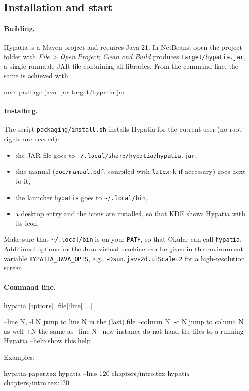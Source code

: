 \documentclass[11pt]{article}
\newcommand{\menu}[1]{\textsf{\textit{#1}}}
\newcommand{\file}[1]{\texttt{#1}}
\begin{document}
    \subsection{Installation and start}

    \paragraph{Building.}     Hypatia is a Maven project and requires Java 21. In NetBeans, open the project folder with \menu{File > Open Project}; \menu{Clean and Build} produces \file{target/hypatia.jar}, a single runnable JAR file containing all libraries. From the command line, the same is achieved with
    \begin{Code}
mvn package
java -jar target/hypatia.jar
    \end{Code}

    \paragraph{Installing.}     The script \file{packaging/install.sh} installs Hypatia for the current user (no root rights are needed):
    \begin{itemize}
        \itemsep-1mm
        \item the JAR file goes to \file{\textasciitilde/.local/share/hypatia/hypatia.jar},
        \item this manual (\file{doc/manual.pdf}, compiled with \verb+latexmk+ if necessary) goes next to it,
        \item the launcher \verb+hypatia+ goes to \file{\textasciitilde/.local/bin},
        \item a desktop entry and the icons are installed, so that KDE shows Hypatia with its icon.
    \end{itemize}
    Make sure that \file{\textasciitilde/.local/bin} is on your \verb+PATH+, so that Okular can call \verb+hypatia+. Additional options for the Java virtual machine can be given in the environment variable \verb+HYPATIA_JAVA_OPTS+, e.g.\ \verb+-Dsun.java2d.uiScale=2+ for a high-resolution screen.

    \paragraph{Command line.}\label{sec:cmdline}     \begin{Code}
hypatia [options] [file[:line] ...]

  --line N, -l N     jump to line N in the (last) file
  --column N, -c N   jump to column N as well
  +N                 the same as --line N
  --new-instance     do not hand the files to a running Hypatia
  --help             show this help
    \end{Code}
    Examples:
    \begin{Code}
hypatia paper.tex
hypatia --line 120 chapters/intro.tex
hypatia chapters/intro.tex:120
    \end{Code}
\end{document}
